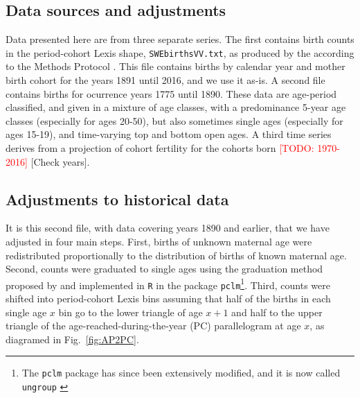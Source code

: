 \documentclass{article}
\newcommand\todo[1]{\textcolor{red}{[TODO: #1]}}
\begin{document}
\FloatBarrier

\singlespacing

   
  
\pagebreak
\begin{appendix}
\section{Data sources and adjustments}
\label{sec:dataprep}
Data presented here are from three separate series. The first
contains birth counts in the period-cohort Lexis shape,
\texttt{SWEbirthsVV.txt}, as produced by the \citet{HFD} according to the Methods
Protocol \citep{hfd2015methods}. This file contains births by calendar year and
mother birth cohort for the years 1891 until 2016, and we use it as-is. A
second file contains births for ocurrence years 1775 until 1890. These data are
age-period classified, and given in a mixture of age classes, with a
predominance 5-year age classes (especially for ages 20-50), but also sometimes
single ages (especially for ages 15-19), and time-varying top and bottom open
ages. A third time series derives from a projection of cohort fertility for the cohorts born \todo{1970-2016} [Check years].

\subsection{Adjustments to historical data}
It is this second file, with data covering years 1890 and earlier, that we have
adjusted in four main steps. First, births of unknown maternal age were redistributed proportionally to the distribution of births of known maternal age. Second, counts were graduated to single ages using the graduation method proposed by \citet{rizzi2015efficient} and implemented in \texttt{R} in the package \texttt{pclm}\footnote{The \texttt{pclm} package has since been extensively modified, and it is now called \texttt{ungroup} \citep{pclmR}}. Third, counts were shifted into period-cohort Lexis bins assuming that half of the births in each single age $x$ bin go to the lower triangle of age $x+1$ and half to the upper triangle of the age-reached-during-the-year (PC) parallelogram at age $x$, as diagramed in Fig.~\ref{fig:AP2PC}.


\end{appendix}
\end{document}
